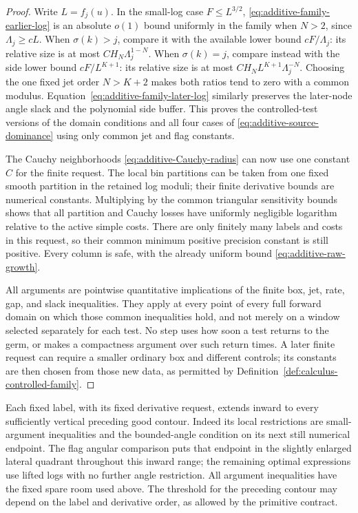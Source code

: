 \begin{proof}
Write $L=f_j(u)$.  In the small-log case $F\le L^{3/2}$,
\eqref{eq:additive-family-earlier-log} is an absolute $o(1)$ bound
uniformly in the family when $N>2$, since $\Lambda_j\ge cL$.
When $\sigma(k)>j$, compare it with the available lower bound
$cF/\Lambda_j$: its relative size is at most
$CH_N\Lambda_j^{1-N}$.  When $\sigma(k)=j$, compare instead with
the side lower bound $cF/L^{K+1}$: its relative size is at most
$CH_NL^{K+1}\Lambda_j^{-N}$.  Choosing the one fixed jet order
$N>K+2$ makes both ratios tend to zero with a common modulus.
Equation~\eqref{eq:additive-family-later-log} similarly preserves the
later-node angle slack and the polynomial side buffer.  This proves
the controlled-test versions of the domain conditions and all four
cases of \eqref{eq:additive-source-dominance} using only common jet
and flag constants.

The Cauchy neighborhoods \eqref{eq:additive-Cauchy-radius} can now use
one constant $C$ for the finite request.  The local bin partitions can
be taken from one fixed smooth partition in the retained log moduli;
their finite derivative bounds are numerical constants.  Multiplying
by the common triangular sensitivity bounds shows that all partition
and Cauchy losses have uniformly negligible logarithm relative to the
active simple costs.  There are only finitely many labels and costs in
this request, so their common minimum positive precision constant is
still positive.  Every column is safe, with the already uniform bound
\eqref{eq:additive-raw-growth}.

All arguments are pointwise quantitative implications of the finite
box, jet, rate, gap, and slack inequalities.  They apply at every
point of every full forward domain on which those common inequalities
hold, and not merely on a window selected separately for each test.
No step uses how soon a test returns to the germ, or makes a compactness
argument over such return times.  A later finite request can require a
smaller ordinary box and different controls; its constants are then
chosen from those new data, as permitted by
Definition~\ref{def:calculus-controlled-family}.
\end{proof}

Each fixed label, with its fixed derivative request, extends inward to
every sufficiently vertical preceding good contour.  Indeed its local
restrictions are small-argument inequalities and the bounded-angle
condition on its next still numerical endpoint.  The flag angular
comparison puts that endpoint in the slightly enlarged lateral quadrant
throughout this inward range; the remaining optimal expressions use
lifted logs with no further angle restriction.  All argument inequalities
have the fixed spare room used above.  The threshold for the preceding
contour may depend on the label and derivative order, as allowed by the
primitive contract.

